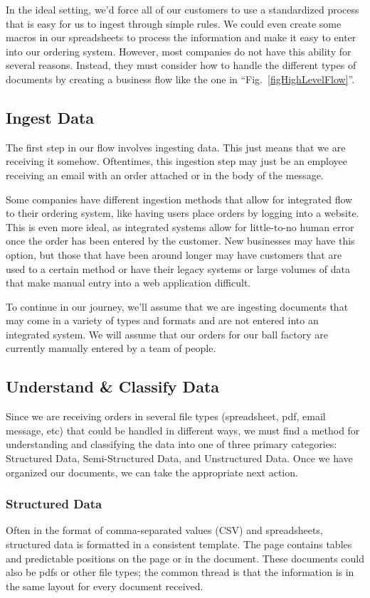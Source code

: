 \documentclass[conference, draftcls]{IEEEtran}
\begin{document}
In the ideal setting, we'd force all of our customers to use a standardized process that is easy for us to ingest through simple rules. We could even create some macros in our spreadsheets to process the information and make it easy to enter into our ordering system. However, most companies do not have this ability for several reasons. Instead, they must consider how to handle the different types of documents by creating a business flow like the one in ``Fig.~\ref{figHighLevelFlow}''.

\subsection{Ingest Data}
The first step in our flow involves ingesting data. This just means that we are receiving it somehow. Oftentimes, this ingestion step may just be an employee receiving an email with an order attached or in the body of the message.

Some companies have different ingestion methods that allow for integrated flow to their ordering system, like having users place orders by logging into a website. This is even more ideal, as integrated systems allow for little-to-no human error once the order has been entered by the customer. New businesses may have this option, but those that have been around longer may have customers that are used to a certain method or have their legacy systems or large volumes of data that make manual entry into a web application difficult.

To continue in our journey, we'll assume that we are ingesting documents that may come in a variety of types and formats and are not entered into an integrated system. We will assume that our orders for our ball factory are currently manually entered by a team of people.

\subsection{Understand \& Classify Data}
Since we are receiving orders in several file types (spreadsheet, pdf, email message, etc) that could be handled in different ways, we must find a method for understanding and classifying the data into one of three primary categories: Structured Data, Semi-Structured Data, and Unstructured Data. Once we have organized our documents, we can take the appropriate next action.

\subsubsection{Structured Data}
Often in the format of comma-separated values (CSV) and spreadsheets, structured data is formatted in a consistent template. The page contains tables and predictable positions on the page or in the document. These documents could also be pdfs or other file types; the common thread is that the information is in the same layout for every document received.
\end{document}
